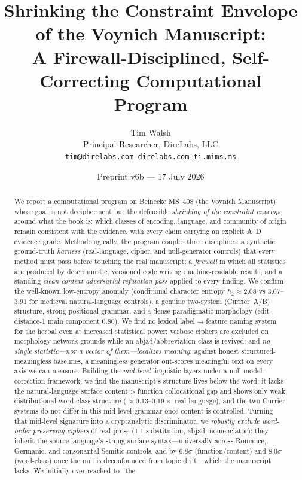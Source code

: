 \documentclass[11pt]{article}
\title{\textbf{Shrinking the Constraint Envelope of the Voynich Manuscript:\\
A Firewall-Disciplined, Self-Correcting Computational Program}}
\author{Tim Walsh \\ \small Principal Researcher, DireLabs, LLC \\
\small \texttt{tim@direlabs.com \quad direlabs.com \quad ti.mims.ms}}
\date{Preprint v6b --- 17 July 2026}
\begin{document}
\maketitle

\begin{abstract}
\noindent We report a computational program on Beinecke MS~408 (the Voynich
Manuscript) whose goal is not decipherment but the defensible \emph{shrinking of the
constraint envelope} around what the book is: which classes of encoding, language,
and community of origin remain consistent with the evidence, with every claim carrying
an explicit A--D evidence grade. Methodologically, the program couples three
disciplines: a synthetic ground-truth \emph{harness} (real-language, cipher, and
null-generator controls) that every method must pass before touching the real
manuscript; a \emph{firewall} in which all statistics are produced by deterministic,
versioned code writing machine-readable results; and a standing \emph{clean-context
adversarial refutation pass} applied to every finding. We confirm the well-known
low-entropy anomaly (conditional character entropy $h_2\approx 2.08$ vs
$3.07$--$3.91$ for medieval natural-language controls), a genuine two-system
(Currier~A/B) structure, strong positional grammar, and a dense paradigmatic
morphology (edit-distance-1 main component $0.80$). We find no lexical
label$\rightarrow$feature naming system for the herbal even at increased statistical
power; verbose ciphers are excluded on morphology-network grounds while an
abjad/abbreviation class is revived; and \emph{no single statistic---nor a vector of
them---localizes meaning}: against honest structured-meaningless baselines, a
meaningless generator out-scores meaningful text on every axis we can measure. Building
the \emph{mid-level} linguistic layers under a null-model-correction framework, we find
the manuscript's structure lives below the word: it lacks the natural-language surface
content$>$function collocational gap and shows only weak distributional word-class
structure ($\approx\!0.13$--$0.19\times$ real language), and the two Currier systems do
not differ in this mid-level grammar once content is controlled. Turning that mid-level
signature into a cryptanalytic discriminator, we \emph{robustly exclude
word-order-preserving ciphers} of real prose (1:1 substitution, abjad, nomenclator): they
inherit the source language's strong surface syntax---universally across Romance, Germanic,
and consonantal-Semitic controls, and by $6.8\sigma$ (function/content) and $8.0\sigma$
(word-class) once the null is deconfounded from topic drift---which the manuscript lacks. We initially over-reached to ``the

\end{abstract}
\end{document}
